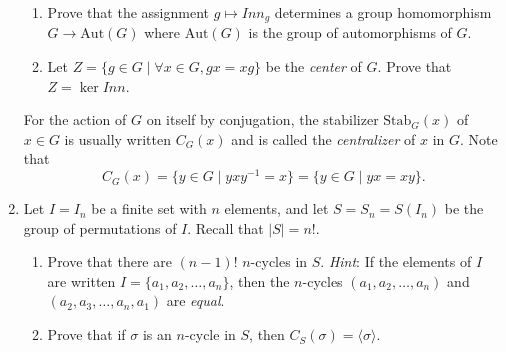 \documentclass{article}
\begin{document}
\begin{enumerate}
\begin{enumerate}
    \item Prove that the assignment $g \mapsto Inn_g$ determines a group homomorphism $G \to \text{Aut}(G)$ where $\text{Aut}(G)$ is the group of automorphisms of $G$.
    \item Let $Z = \{g \in G \mid \forall x \in G, gx = xg\}$ be the \textit{center} of $G$. Prove that $Z = \ker Inn$.
\end{enumerate}

For the action of $G$ on itself by conjugation, the stabilizer $\text{Stab}_G (x)$ of $x \in G$ is usually written $C_G (x)$ and is called the \textit{centralizer} of $x$ in $G$. Note that
$$C_G (x) = \{y \in G \mid yxy^{-1} = x\} = \{y \in G \mid yx = xy\}.$$

\item
Let $I = I_n$ be a finite set with $n$ elements, and let $S = S_n = S(I_n)$ be the group of permutations of $I$. Recall that $|S| = n!$.

\begin{enumerate}
    \item Prove that there are $(n-1)!$ $n$-cycles in $S$. \textit{Hint}: If the elements of $I$ are written $I = \{a_1, a_2, \ldots, a_n\}$, then the $n$-cycles $(a_1, a_2, \ldots, a_n)$ and $(a_2, a_3, \ldots, a_n, a_1)$ are \textit{equal}.
    \item Prove that if $\sigma$ is an $n$-cycle in $S$, then $C_S (\sigma) = \langle \sigma \rangle$.
\end{enumerate}
\end{enumerate}
\end{document}
